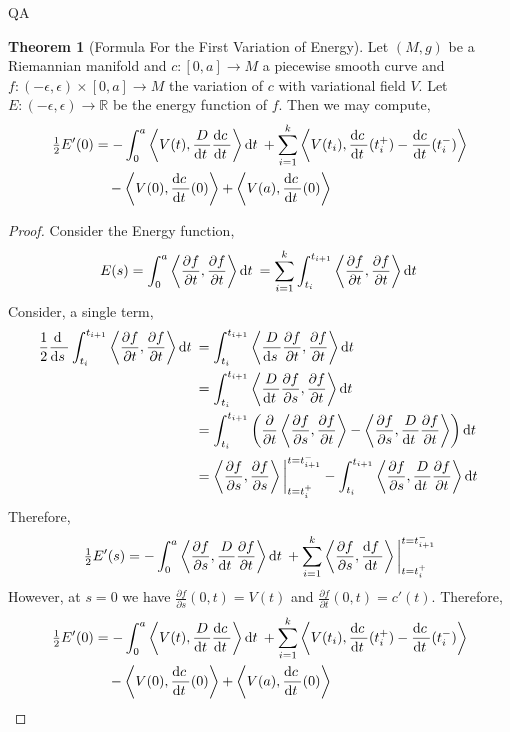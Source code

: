 QA	 \documentclass[12pt]{extarticle}
\newcommand{\R}{\mathbb{R}}
\renewcommand{\d}[1]{ \mathrm{d}#1 \:}
\newcommand{\deriv}[2]{\frac{\d{#1}}{\d{#2}}}
\newcommand{\pderiv}[2]{\frac{\partial{#1}}{\partial{#2}}}
\theoremstyle{definition}
\newtheorem{theorem}{Theorem}[section]
\begin{document}
\begin{theorem}[Formula For the First Variation of Energy]
Let $(M, g)$ be a Riemannian manifold and $c : [0, a] \to M$ a piecewise smooth curve and $f : (-\epsilon, \epsilon) \times [0, a] \to M$ the variation of $c$ with variational field $V$. Let $E : (-\epsilon, \epsilon) \to \R$ be the energy function of $f$. Then we may compute,
\begin{align*}
\tfrac{1}{2} E'(0) & = - \int_0^a \inner{V(t)}{\frac{D}{\d{t}} \deriv{c}{t}}\d{t} + \sum_{i = 1}^k \inner{V(t_i)}{\deriv{c}{t}(t_i^+) - \deriv{c}{t}(t_i^{-})} 
\\
& \quad - \inner{V(0)}{\deriv{c}{t}(0)} + \inner{V(a)}{\deriv{c}{t}(0)} 
\end{align*} 
\end{theorem}

\begin{proof}
Consider the Energy function,
\[ E(s) = \int_0^a \inner{\pderiv{f}{t}}{\pderiv{f}{t}} \d{t} = \sum_{i = 1}^k \int_{t_i}^{t_{i+1}} \inner{\pderiv{f}{t}}{\pderiv{f}{t}} \d{t} \]
Consider, a single term,
\begin{align*}
\frac{1}{2} \deriv{}{s} \int_{t_i}^{t_{i+1}} \inner{\pderiv{f}{t}}{\pderiv{f}{t}} \d{t} & = \int_{t_i}^{t_{i+1}} \inner{\frac{D}{\d{s}} \pderiv{f}{t}}{\pderiv{f}{t}} \d{t} 
\\
& = \int_{t_i}^{t_{i+1}} \inner{\frac{D}{\d{t}} \pderiv{f}{s}}{\pderiv{f}{t}} \d{t} 
\\
& = \int_{t_i}^{t_{i+1}} \left( \pderiv{}{t} \inner{\pderiv{f}{s}}{\pderiv{f}{t}} - \inner{\pderiv{f}{s}}{\frac{D}{\d{t}} \pderiv{f}{t}} \right) \d{t}
\\
& = \inner{\pderiv{f}{s}}{\pderiv{f}{s}} \bigg|_{t = t_i^+}^{t = t_{i+1}^{-}} - \int_{t_i}^{t_{i+1}} \inner{\pderiv{f}{s}}{\frac{D}{\d{t}} \pderiv{f}{t}} \d{t}
\end{align*}
Therefore,
\begin{align*}
\tfrac{1}{2} E'(s) = - \int_0^a \inner{\pderiv{f}{s}}{\frac{D}{\d{t}} \pderiv{f}{t}} \d{t}  + \sum_{i = 1}^k \inner{\pderiv{f}{s}}{\deriv{f}{t}} \bigg|_{t = t_i^+}^{t = t_{i+1}^-}
\end{align*}
However, at $s = 0$ we have $\pderiv{f}{s}(0, t) = V(t)$ and $\pderiv{f}{t}(0, t) = c'(t)$. Therefore,
\begin{align*}
\tfrac{1}{2} E'(0) & = - \int_0^a \inner{V(t)}{\frac{D}{\d{t}} \deriv{c}{t}}\d{t} + \sum_{i = 1}^k \inner{V(t_i)}{\deriv{c}{t}(t_i^+) - \deriv{c}{t}(t_i^{-})} 
\\
& \quad - \inner{V(0)}{\deriv{c}{t}(0)} + \inner{V(a)}{\deriv{c}{t}(0)} 
\end{align*} 
\end{proof}
\end{document}
